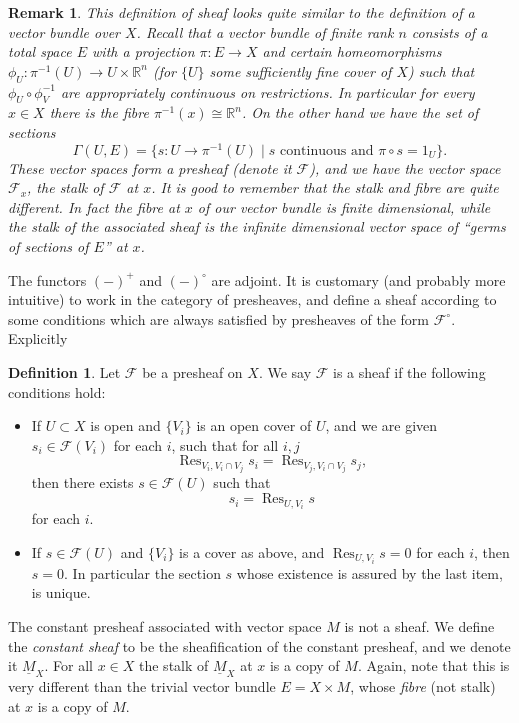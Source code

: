 \documentclass[12pt]{article}
\theoremstyle{plain}
\newtheorem{rem}[thm]{Remark}
\theoremstyle{definition}
\newtheorem{defn}{Definition}[section]
\numberwithin{equation}{section}
\DeclareMathOperator{\res}{Res}
\newcommand{\R}{\mathbb{R}}
\newcommand{\CF}{\mathcal{F}}
\begin{document}
\begin{rem}
This definition of sheaf looks quite similar to the definition of a vector bundle over $X$. Recall that a vector bundle of finite rank $n$ consists of a total space $E$ with a projection $\pi : E \rightarrow X$ and certain homeomorphisms $\phi_U : \pi^{-1}(U) \rightarrow U \times \R^n$ (for $\{U\}$ some sufficiently fine cover of $X$) such that $\phi_U \circ \phi_V^{-1}$ are appropriately continuous on restrictions. In particular for every $x \in X$ there is the \emph{fibre} $\pi^{-1}(x) \cong \R^n$. On the other hand we have the set of sections
\[
\Gamma(U, E) = \{s : U \rightarrow \pi^{-1}(U) \mid \text{$s$ continuous and $\pi \circ s = 1_U$}\}.
\]
These vector spaces form a presheaf (denote it $\CF$), and we have the vector space $\CF_x$, the \emph{stalk} of $\CF$ at $x$. It is good to remember that the stalk and fibre are quite different. In fact the fibre at $x$ of our vector bundle is finite dimensional, while the stalk of the associated sheaf is the infinite dimensional vector space of ``germs of sections of $E$'' at $x$.
\end{rem}

The functors $(-)^+$ and $(-)^\circ$ are adjoint. It is customary (and probably more intuitive) to work in the category of presheaves, and define a sheaf according to some conditions which are always satisfied by presheaves of the form $\CF^\circ$. Explicitly
\begin{defn}
Let $\CF$ be a presheaf on $X$. We say $\CF$ is a sheaf if the following conditions hold:
\begin{itemize}
\item If $U \subset X$ is open and $\{V_i\}$ is an open cover of $U$, and we are given $s_i \in \CF(V_i)$ for each $i$, such that for all $i, j$
\[
\res_{V_i, V_i \cap V_j} s_i = \res_{V_j, V_i \cap V_j} s_j,
\]
then there exists $s \in \CF(U)$ such that
\[
s_i = \res_{U, V_i} s
\]
for each $i$.

\item If $s \in \CF(U)$ and $\{V_i\}$ is a cover as above, and $\res_{U, V_i} s = 0$ for each $i$, then $s = 0$. In particular the section $s$ whose existence is assured by the last item, is unique.
\end{itemize}
\end{defn}
The constant presheaf associated with vector space $M$ is not a sheaf. We define the \emph{constant sheaf} to be the sheafification of the constant presheaf, and we denote it $\underline{M}_X$. For all $x \in X$ the stalk of $\underline{M}_X$ at $x$ is a copy of $M$. Again, note that this is very different than the trivial vector bundle $E = X \times M$, whose \emph{fibre} (not stalk) at $x$ is a copy of $M$.
\end{document}
